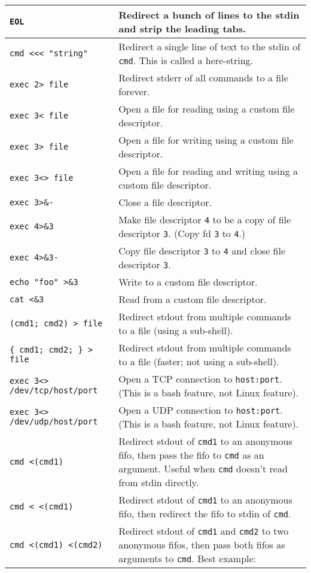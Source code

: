 \documentclass[9pt]{memoir}
\begin{document}
\begin{tabular}{|m{5.5cm}|m{12.2cm}|}
{\verb|EOL|
} & Redirect a bunch of lines to the stdin and strip the leading tabs. \\
\hline
\verb|cmd <<< "string"| & Redirect a single line of text to the stdin of \verb|cmd|. This is called a here-string. \\
\hline
\verb|exec 2> file| & Redirect stderr of all commands to a file forever. \\
\hline
\verb|exec 3< file| & Open a file for reading using a custom file descriptor. \\
\hline
\verb|exec 3> file| & Open a file for writing using a custom file descriptor. \\
\hline
\verb|exec 3<> file| & Open a file for reading and writing using a custom file descriptor. \\
\hline
\verb|exec 3>&-| & Close a file descriptor. \\
\hline
\verb|exec 4>&3| & Make file descriptor \verb|4| to be a copy of file descriptor \verb|3|. (Copy fd \verb|3| to \verb|4|.) \\
\hline
\verb|exec 4>&3-| & Copy file descriptor \verb|3| to \verb|4| and close file descriptor \verb|3|. \\
\hline
\verb|echo "foo" >&3| & Write to a custom file descriptor. \\
\hline
\verb|cat <&3| & Read from a custom file descriptor. \\
\hline
\verb|(cmd1; cmd2) > file| & Redirect stdout from multiple commands to a file (using a sub-shell). \\
\hline
\verb|{ cmd1; cmd2; } > file| & Redirect stdout from multiple commands to a file (faster; not using a sub-shell). \\
\hline
\verb|exec 3<> /dev/tcp/host/port| & Open a TCP connection to \verb|host:port|. (This is a bash feature, not Linux feature). \\
\hline
\verb|exec 3<> /dev/udp/host/port| & Open a UDP connection to \verb|host:port|. (This is a bash feature, not Linux feature). \\
\hline
\verb|cmd <(cmd1)| & Redirect stdout of \verb|cmd1| to an anonymous fifo, then pass the fifo to \verb|cmd| as an argument. Useful when \verb|cmd| doesn't read from stdin directly. \\
\hline
\verb|cmd < <(cmd1)| & Redirect stdout of \verb|cmd1| to an anonymous fifo, then redirect the fifo to stdin of \verb|cmd|. \\
\hline
\verb|cmd <(cmd1) <(cmd2) | & Redirect stdout of \verb|cmd1| and \verb|cmd2| to two anonymous fifos, then pass both fifos as arguments to \verb|cmd|. Best example: \verb\diff <(find /path1 | sort) <(find /path2 | sort)\. \\

\end{tabular}
\end{document}
